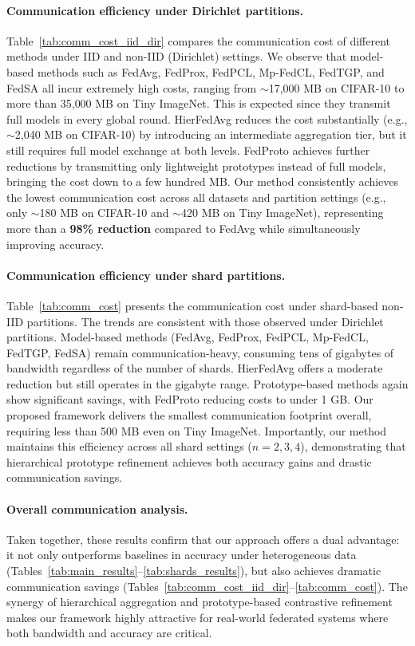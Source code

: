 \documentclass[twoside]{article}
\begin{document}
        \paragraph{Communication efficiency under Dirichlet partitions.} 
        Table~\ref{tab:comm_cost_iid_dir} compares the communication cost of different methods under IID and non-IID (Dirichlet) settings. 
        We observe that model-based methods such as FedAvg, FedProx, FedPCL, Mp-FedCL, FedTGP, and FedSA all incur extremely high costs, ranging from $\sim$17{,}000 MB on CIFAR-10 to more than 35{,}000 MB on Tiny ImageNet. 
        This is expected since they transmit full models in every global round. 
        HierFedAvg reduces the cost substantially (e.g., $\sim$2{,}040 MB on CIFAR-10) by introducing an intermediate aggregation tier, but it still requires full model exchange at both levels. 
        FedProto achieves further reductions by transmitting only lightweight prototypes instead of full models, bringing the cost down to a few hundred MB. 
        Our method consistently achieves the lowest communication cost across all datasets and partition settings (e.g., only $\sim$180 MB on CIFAR-10 and $\sim$420 MB on Tiny ImageNet), representing more than a \textbf{98\% reduction} compared to FedAvg while simultaneously improving accuracy. 
        
        \paragraph{Communication efficiency under shard partitions.} 
        Table~\ref{tab:comm_cost} presents the communication cost under shard-based non-IID partitions. 
        The trends are consistent with those observed under Dirichlet partitions. 
        Model-based methods (FedAvg, FedProx, FedPCL, Mp-FedCL, FedTGP, FedSA) remain communication-heavy, consuming tens of gigabytes of bandwidth regardless of the number of shards. 
        HierFedAvg offers a moderate reduction but still operates in the gigabyte range. 
        Prototype-based methods again show significant savings, with FedProto reducing costs to under 1 GB. 
        Our proposed framework delivers the smallest communication footprint overall, requiring less than 500 MB even on Tiny ImageNet. 
        Importantly, our method maintains this efficiency across all shard settings ($n=2,3,4$), demonstrating that hierarchical prototype refinement achieves both accuracy gains and drastic communication savings. 
        
        \paragraph{Overall communication analysis.} 
        Taken together, these results confirm that our approach offers a dual advantage: it not only outperforms baselines in accuracy under heterogeneous data (Tables~\ref{tab:main_results}--\ref{tab:shards_results}), but also achieves dramatic communication savings (Tables~\ref{tab:comm_cost_iid_dir}--\ref{tab:comm_cost}). 
        The synergy of hierarchical aggregation and prototype-based contrastive refinement makes our framework highly attractive for real-world federated systems where both bandwidth and accuracy are critical. 
        
\end{document}
